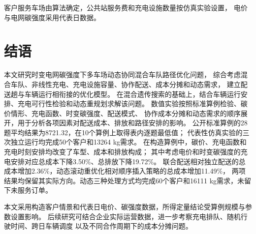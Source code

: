 \documentclass{setp-new}
\begin{document}
客户服务车场由算法确定，公共站服务费和充电设施数量按仿真实验设置，
电价与电网碳强度采用代表日数据。

\section{结语}

本文研究时变电网碳强度下多车场动态协同混合车队路径优化问题，
综合考虑混合车队、非线性充电、充电设施容量、协作配送、成本分摊和动态需求，
建立配送趟与车辆运行相衔接的优化模型。
在混合遗传搜索的基础上，结合车辆运行安排、充电可行性检验和动态重规划求解该问题。
数值实验按照标准算例检验、碳价情形、充电函数、时变碳强度、配送模式、
协作成本分摊和动态需求的顺序展开，用于分析各项因素对配送成本、排放和路径安排的影响。
公开标准算例的28题平均结果为8721.32，在10个算例上取得表内逐题最低值；
代表性仿真实验的三次独立运行均完成50个客户和13264 kg需求。
在构造算例中，碳价、充电函数和充电时刻安排均改变了车型、成本和排放构成；
其中考虑电价和时变碳强度的充电安排对应总成本下降3.50\%、总排放下降19.72\%。
联合配送相对独立配送的总成本增加2.36\%，动态滚动重优化相对顺序插入策略的总成本增加11.49\%，
两项结果均保留其实际方向。动态三种处理方式均完成60个客户和16111 kg需求，未留下未服务订单。

本文采用构造客户情景和代表日电价、碳强度数据，所得定量结论受算例规模与参数设置影响。
后续研究可结合企业实际运营数据，进一步考察充电排队、随机行驶时间、跨日车辆调度
以及不同合作周期下的成本分摊问题。
\end{document}
